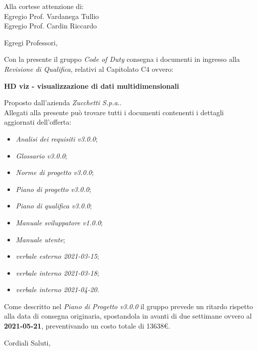 \documentclass[11pt]{letter}
\begin{document}
\begin{letter}{Alla cortese attenzione di: \\ Egregio Prof. Vardanega Tullio \\ Egregio Prof. Cardin Riccardo}
\date{21 Aprile, 2021}
\opening{Egregi Professori,}
Con la presente il gruppo \textit{Code of Duty} consegna i documenti in ingresso alla \textit{Revisione di Qualifica}, relativi al Capitolato C4 ovvero:
\begin{center}
    \textbf{HD viz -  visualizzazione di dati multidimensionali}
\end{center}
Proposto dall'azienda \textit{Zucchetti S.p.a.}.\\
Allegati alla presente può trovare tutti i documenti contenenti i dettagli aggiornati dell'offerta:
\begin{itemize}
    \item \textit{Analisi dei requisiti v3.0.0};
    \item \textit{Glossario v3.0.0};
    \item \textit{Norme di progetto v3.0.0};
    \item \textit{Piano di progetto v3.0.0};
    \item \textit{Piano di qualifica v3.0.0};
    \item \textit{Manuale sviluppatore v1.0.0};
    \item \textit{Manuale utente};
    \item \textit{verbale esterno 2021-03-15};
    \item \textit{verbale interno 2021-03-18};
    \item \textit{verbale interno 2021-04-20}.
\end{itemize}

\pagebreak

Come descritto nel \textit{Piano di Progetto v3.0.0} il gruppo prevede un ritardo rispetto alla data di consegna originaria, spostandola in avanti di due settimane ovvero al \textbf{2021-05-21}, preventivando un costo totale di 13638€.
\closing{Cordiali Saluti,}
\end{letter}
\end{document}

